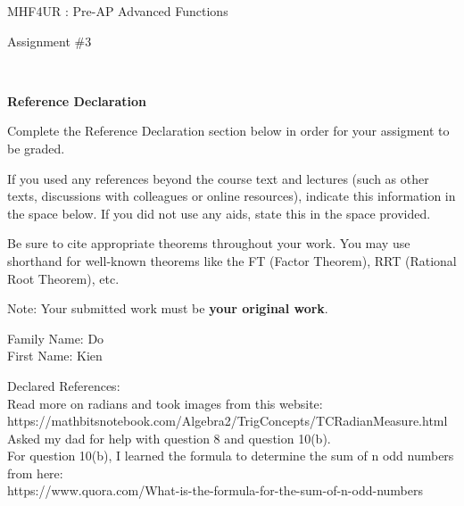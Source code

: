 \documentclass[12pt]{book}
\begin{document}
\vspace{-1.0in}\begin{center}
\Large{MHF4UR : Pre-AP Advanced Functions }

\Large{Assignment \#3}


\end{center}


\vspace{0.015in}\hrulefill\ 

\textbf{Reference Declaration} %

Complete the Reference Declaration section below in order for your assigment to be graded.

If you used any references beyond the course text and lectures (such as other texts, discussions with colleagues or online resources), indicate this information in the space below.  If you did not use any aids, state this in the space provided. 

Be sure to cite appropriate theorems throughout your work. You may use shorthand for well-known theorems like the FT (Factor Theorem), RRT (Rational Root Theorem), etc. 

Note: Your submitted work must be \textbf{your original work}. 

Family Name: Do\\%
First Name: Kien%

Declared References:\\
Read more on radians and took images from this website:\\
https://mathbitsnotebook.com/Algebra2/TrigConcepts/TCRadianMeasure.html\\

Asked my dad for help with question 8 and question 10(b).\\
For question 10(b), I learned the formula to determine the sum of n odd numbers from here:\\https://www.quora.com/What-is-the-formula-for-the-sum-of-n-odd-numbers


\vspace{0.015in}\hrulefill\ 

\newpage

\end{document}
